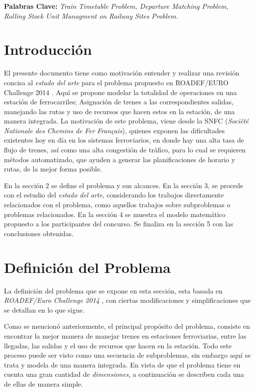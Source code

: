 \documentclass[letter, 10pt]{article}
\begin{document}
\textbf{Palabras Clave:} \textit{Train Timetable Problem, Departure Matching Problem, Rolling Stock Unit Managment on Railway Sites Problem.}

\section{Introducción} \label{intro}
El presente documento tiene como motivación entender y realizar una revisión concisa al \textit{estado del arte} para el problema propuesto en ROADEF/EURO Challenge 2014 \cite{Problem}.  Aquí se propone modelar la totalidad de operaciones en una estación de ferrocarriles; Asignación de trenes a las correspondientes salidas,  manejando las rutas y uso de recursos que hacen estos en la estación, de una manera integrada. La motivación de este problema, viene desde la SNFC (\textit{Société Nationale des Chemins de Fer Français}), quienes exponen las dificultades existentes hoy en día en los sistemas ferroviarios, en donde hay una alta tasa de flujo de trenes, así como una alta congestión de tráfico, para lo cual se requieren métodos automatizado, que ayuden a generar las planificaciones de horario y rutas, de la mejor forma posible.

En la sección 2 se define el problema y sus alcances. En la sección 3, se procede con el estudio del \textit{estado del arte}, considerando los trabajos directamente relacionados con el problema, como aquellos trabajos sobre subproblemas o problemas relacionados. En la sección 4 se muestra el modelo matemático propuesto a los participantes del concurso. Se finaliza en la sección 5 con las conclusiones obtenidas.   


\section{Definición del Problema} \label{probdef}
La definición del problema que se expone en esta sección, esta basada en \textit{ROADEF/Euro Challenge 2014}
\cite{Problem}, con ciertas modificaciones y simplificaciones que se detallan en lo que sigue.


Como se mencionó anteriormente, el principal propósito del problema, consiste en encontrar la mejor
manera de manejar trenes en estaciones ferroviarias, entre las llegadas, las salidas y el uso de recursos
que hacen en la estación. Todo este proceso puede ser visto como una secuencia de subproblemas, sin embargo
aquí se trata y modela de una manera integrada. En vista de que el problema tiene en cuenta una gran
cantidad de \textit{dimensiones}, a continuación se describen cada una de ellas de manera simple.
\end{document}
